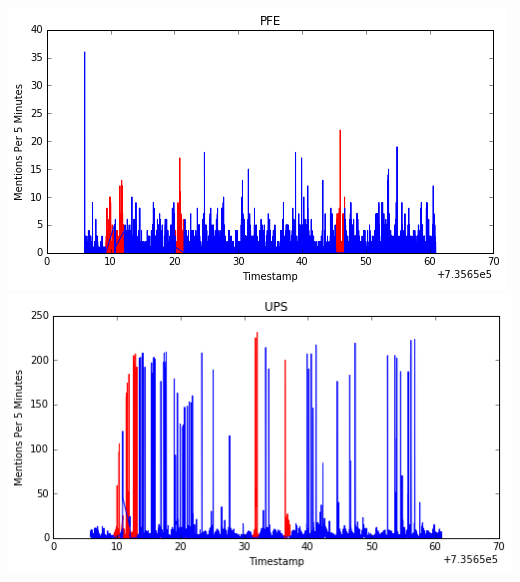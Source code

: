 \documentclass[11pt, margin=1in]{article}
\begin{document}
\begin{center}
\includegraphics[scale=0.4]{img/pfe.png}
\includegraphics[scale=0.4]{img/ups.png}
\end{center}           
\end{document}
